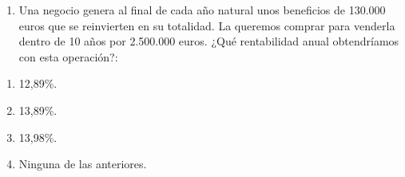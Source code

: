 \documentclass[
  letterpaper,
  DIV=11,
  numbers=noendperiod]{scrreprt}
\providecommand{\tightlist}{%
  \setlength{\itemsep}{0pt}\setlength{\parskip}{0pt}}\usepackage{longtable,booktabs,array}
\begin{document}
\begin{enumerate}
\def\labelenumi{\arabic{enumi}.}
\setcounter{enumi}{34}
\tightlist
\item
  Una negocio genera al final de cada año natural unos beneficios de
  130.000 euros que se reinvierten en su totalidad. La queremos comprar
  para venderla dentro de 10 años por 2.500.000 euros. ¿Qué rentabilidad
  anual obtendríamos con esta operación?:
\end{enumerate}

\begin{enumerate}
\def\labelenumi{\alph{enumi})}
\item
  12,89\%.
\item
  13,89\%.
\item
  13,98\%.
\item
  Ninguna de las anteriores.
\end{enumerate}
\end{document}
